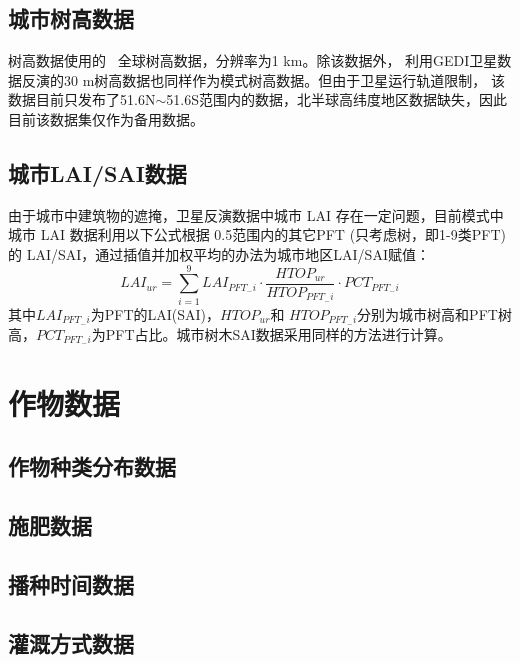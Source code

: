 \subsection{城市树高数据}\label{城市树高数据}
树高数据使用的~\citet{simard2011mapping} 全球树高数据，分辨率为1 km。除该数据外， \citet{potapov2021mapping} 
利用GEDI卫星数据反演的30 m树高数据也同样作为模式树高数据。但由于卫星运行轨道限制，
该数据目前只发布了51.6\textdegree N$\sim$51.6\textdegree S范围内的数据，北半球高纬度地区数据缺失，因此目前该数据集仅作为备用数据。


\subsection{城市LAI/SAI数据}\label{城市LAISAI数据}
由于城市中建筑物的遮掩，卫星反演数据中城市 LAI 存在一定问题，目前模式中城市 LAI 数据利用以下公式根据 0.5\textdegree 范围内的其它PFT (只考虑树，即1-9类PFT)的 LAI/SAI，通过插值并加权平均的办法为城市地区LAI/SAI赋值：
\begin{equation}
L A I_{u r}=\sum_{i=1}^{9} L A I_{P F T_{-} i} \cdot \frac{H T O P_{u r}}{H T O P_{P F T_{-} i}} \cdot P C T_{P F T_{-} i}
\end{equation}
其中$LAI_{PFT_{-}i}$为PFT的LAI(SAI)，$HTOP_{ur}$和 $HTOP_{PFT_{-} i}$分别为城市树高和PFT树高，$PCT_{PFT_{-} i}$为PFT占比。城市树木SAI数据采用同样的方法进行计算。


\section{作物数据}

\subsection{作物种类分布数据}\label{作物种类分布数据}



\subsection{施肥数据}\label{施肥数据}



\subsection{播种时间数据}\label{播种时间数据}



\subsection{灌溉方式数据}\label{灌溉方式数据}



